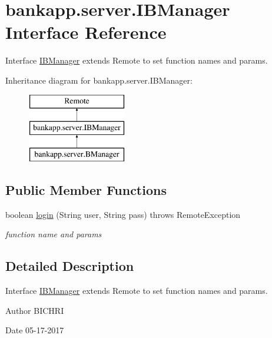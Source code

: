 \hypertarget{interfacebankapp_1_1server_1_1IBManager}{}\section{bankapp.\+server.\+I\+B\+Manager Interface Reference}
\label{interfacebankapp_1_1server_1_1IBManager}


Interface \hyperlink{interfacebankapp_1_1server_1_1IBManager}{I\+B\+Manager} extends Remote to set function names and params.  


Inheritance diagram for bankapp.\+server.\+I\+B\+Manager\+:\begin{figure}[H]
\begin{center}
\leavevmode
\includegraphics[height=3.000000cm]{interfacebankapp_1_1server_1_1IBManager}
\end{center}
\end{figure}
\subsection*{Public Member Functions}
\begin{DoxyCompactItemize}
\item 
boolean \hyperlink{interfacebankapp_1_1server_1_1IBManager_a29f3426c104732dda17dc8b215b746e1}{login} (String user, String pass)  throws Remote\+Exception
\begin{DoxyCompactList}\small\item\em function name and params \end{DoxyCompactList}\end{DoxyCompactItemize}


\subsection{Detailed Description}
Interface \hyperlink{interfacebankapp_1_1server_1_1IBManager}{I\+B\+Manager} extends Remote to set function names and params. 

\begin{DoxyAuthor}{Author}
B\+I\+C\+H\+RI 
\end{DoxyAuthor}
\begin{DoxyDate}{Date}
05-\/17-\/2017 
\end{DoxyDate}



